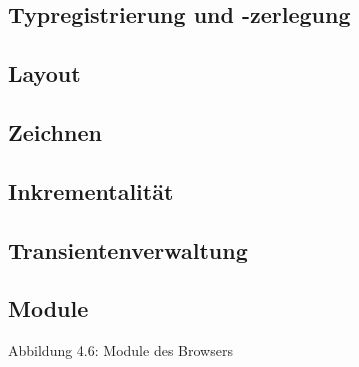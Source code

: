 \documentclass[12pt,a4paper]{article}
\begin{document}
\subsection{Typregistrierung und -zerlegung}

\subsection{Layout}

\subsection{Zeichnen}

\subsection{Inkrementalit\"at} 


\subsection{Transientenverwaltung}

\newpage

\subsection{Module}

\begin{center}
\linebreak Abbildung 4.6: Module des Browsers
\end{center}
\end{document}
